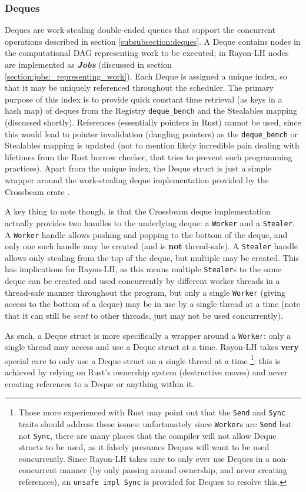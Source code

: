\documentclass[bsc,frontabs,singlespacing,parskip,deptreport,normalheadings]{infthesis}
\begin{document}
\subsubsection*{Deques}

Deques are work-stealing double-ended queues that support the concurrent
operations described in section \ref{subsubsection:deques}. A Deque contains
nodes in the computational DAG representing work to be executed; in Rayon-LH
nodes are implemented as \textit{\textbf{Jobs}} (discussed in section
\ref{section:jobs:_representing_work}). Each Deque is assigned a unique index,
so that it may be uniquely referenced throughout the scheduler. The primary
purpose of this index is to provide quick constant time retrieval (as keys in a
hash map) of deques from the Registry \texttt{deque\_bench} and the Stealables
mapping (discussed shortly). References (essentially pointers in Rust) cannot be
used, since this would lead to pointer invalidation (dangling pointers) as the
\texttt{deque\_bench} or Stealables mapping is updated (not to mention likely
incredible pain dealing with lifetimes from the Rust borrow checker, that tries
to prevent such programming practices). Apart from the unique index, the Deque
struct is just a simple wrapper around the work-stealing deque implementation
provided by the Crossbeam crate \cite{noauthor_crossbeam_2022}.

A key thing to note though, is that the Crossbeam deque implementation actually
provides two handles to the underlying deque: a \texttt{Worker} and a
\texttt{Stealer}. A \texttt{Worker} handle allows pushing and popping to the
bottom of the deque, and only one such handle may be created (and is
\textbf{not} thread-safe). A \texttt{Stealer} handle allows only stealing from
the top of the deque, but multiple may be created. This has implications for
Rayon-LH, as this means multiple \texttt{Stealer}s to the same deque can be
created and used concurrently by different worker threads in a thread-safe
manner throughout the program, but only a single \texttt{Worker} (giving access
to the bottom of a deque) may be in use by a single thread at a time (note that
it can still be \textit{sent} to other threads, just may not be used
concurrently).

As such, a Deque struct is more specifically a wrapper around a \texttt{Worker}:
only a single thread may access and use a Deque struct at a time. Rayon-LH takes
\textbf{very} special care to only use a Deque struct on a single thread at a
time \footnote{Those more experienced with Rust may point out that the
    \texttt{Send} and \texttt{Sync} traits should address these issues:
    unfortunately since \texttt{Worker}s are \texttt{Send} but not
    \texttt{Sync}, there are many places that the compiler will not allow Deque
    structs to be used, as it falsely presumes Deques will want to be used
    concurrently. Since Rayon-LH takes care to only ever use Deques in a
    non-concurrent manner (by only passing around ownership, and never creating
references), an \texttt{unsafe impl Sync} is provided for Deques to resolve
this.}: this is achieved by relying on Rust's ownership system (destructive
moves) and never creating references to a Deque or anything within it.
\end{document}
